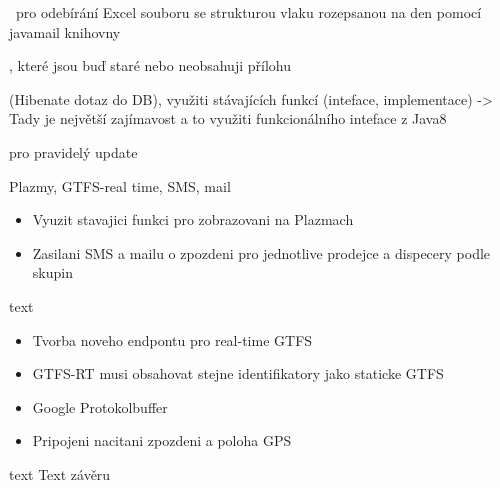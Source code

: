 	
	
~pro odebírání Excel souboru se strukturou vlaku rozepsanou na den
 pomocí javamail knihovny
	
	
, které jsou buď staré nebo neobsahuji přílohu
	
	
	
 (Hibenate dotaz do DB), využiti stávajících funkcí
 (inteface, implementace) -> Tady je největší zajímavost a to využiti funkcionálního inteface z Java8~\cite{java8}
	
	
 pro pravidelý update
	
	

Plazmy, GTFS-real time, SMS, mail

\begin{itemize}
	\item Vyuzit stavajici funkci pro zobrazovani na Plazmach
	\item Zasilani SMS a mailu o zpozdeni pro jednotlive prodejce a dispecery podle skupin
\end{itemize}

text

\begin{itemize}
	\item Tvorba noveho endpontu pro real-time GTFS
	\item GTFS-RT musi obsahovat stejne identifikatory jako staticke GTFS
	\item Google Protokolbuffer
	\item Pripojeni nacitani zpozdeni a poloha GPS
\end{itemize}

text
Text závěru


